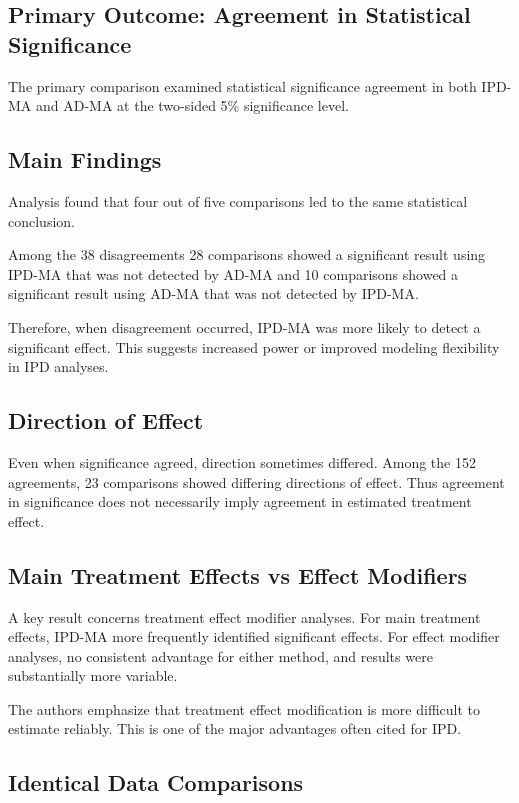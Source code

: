 \documentclass[11pt]{article}
\begin{document}
\subsection*{Primary Outcome: Agreement in Statistical Significance}

The primary comparison examined statistical significance agreement in both IPD-MA and AD-MA at the two-sided 5\% significance level.

\subsection*{Main Findings}

Analysis found that four out of five comparisons led to the same statistical conclusion.

Among the 38 disagreements 28 comparisons showed a significant result using IPD-MA that was not detected by AD-MA and 10 comparisons showed a significant result using AD-MA that was not detected by IPD-MA.

Therefore, when disagreement occurred, IPD-MA was more likely to detect a significant effect. This suggests increased power or improved modeling flexibility in IPD analyses.

\subsection*{Direction of Effect}

Even when significance agreed, direction sometimes differed. Among the 152 agreements, 23 comparisons showed differing directions of effect. Thus agreement in significance does not necessarily imply agreement in estimated treatment effect.

\subsection*{Main Treatment Effects vs Effect Modifiers}

A key result concerns treatment effect modifier analyses. For main treatment effects, IPD-MA more frequently identified significant effects. For effect modifier analyses, no consistent advantage for either method, and results were substantially more variable.

The authors emphasize that treatment effect modification is more difficult to estimate reliably. This is one of the major advantages often cited for IPD.

\subsection*{Identical Data Comparisons}
\end{document}
